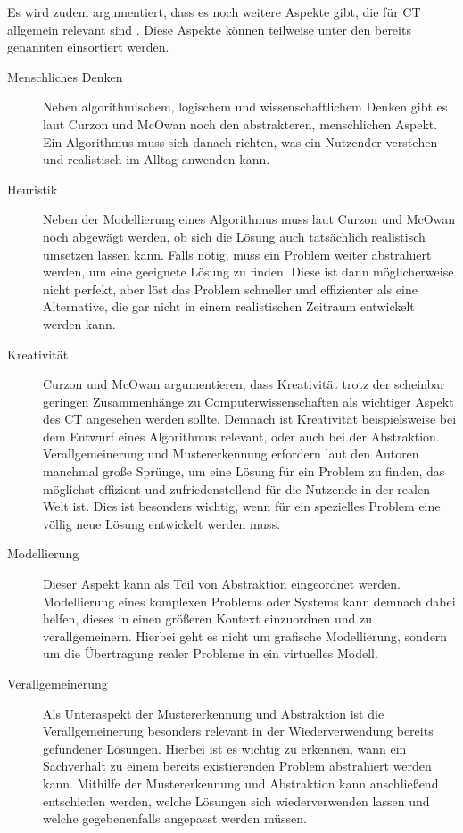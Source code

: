 Es wird zudem argumentiert, dass es noch weitere Aspekte gibt, die für CT allgemein relevant sind \cite{curzon}. Diese Aspekte können teilweise unter den bereits genannten einsortiert werden.

\begin{description}
    \item[Menschliches Denken] Neben algorithmischem, logischem und wissenschaftlichem Denken gibt es laut Curzon und McOwan \cite{curzon} noch den abstrakteren, menschlichen Aspekt. Ein Algorithmus muss sich danach richten, was ein Nutzender verstehen und realistisch im Alltag anwenden kann.
    \item[Heuristik] Neben der Modellierung eines Algorithmus muss laut Curzon und McOwan noch abgewägt werden, ob sich die Lösung auch tatsächlich realistisch umsetzen lassen kann. Falls nötig, muss ein Problem weiter abstrahiert werden, um eine geeignete Lösung zu finden. Diese ist dann möglicherweise nicht perfekt, aber löst das Problem schneller und effizienter als eine Alternative, die gar nicht in einem realistischen Zeitraum entwickelt werden kann.
    \item[Kreativität] Curzon und McOwan argumentieren, dass Kreativität trotz der scheinbar geringen Zusammenhänge zu Computerwissenschaften als wichtiger Aspekt des CT angesehen werden sollte. Demnach ist Kreativität beispielsweise bei dem Entwurf eines Algorithmus relevant, oder auch bei der Abstraktion. Verallgemeinerung und Mustererkennung erfordern laut den Autoren manchmal große Sprünge, um eine Lösung für ein Problem zu finden, das möglichst effizient und zufriedenstellend für die Nutzende in der realen Welt ist. Dies ist besonders wichtig, wenn für ein spezielles Problem eine völlig neue Lösung entwickelt werden muss.
    \item[Modellierung] Dieser Aspekt kann als Teil von Abstraktion eingeordnet werden. Modellierung eines komplexen Problems oder Systems kann demnach dabei helfen, dieses in einen größeren Kontext einzuordnen und zu verallgemeinern. Hierbei geht es nicht um grafische Modellierung, sondern um die Übertragung realer Probleme in ein virtuelles Modell.
    \item[Verallgemeinerung] Als Unteraspekt der Mustererkennung und Abstraktion ist die Verallgemeinerung besonders relevant in der Wiederverwendung bereits gefundener Lösungen. Hierbei ist es wichtig zu erkennen, wann ein Sachverhalt zu einem bereits existierenden Problem abstrahiert werden kann. Mithilfe der Mustererkennung und Abstraktion kann anschließend entschieden werden, welche Lösungen sich wiederverwenden lassen und welche gegebenenfalls angepasst werden müssen.

\end{description}
